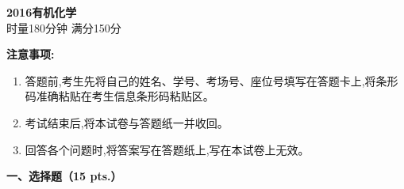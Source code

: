 \begin{center}
    {\LARGE \textbf{2016有机化学}} \\[2ex]
    {\large 时量180分钟 \quad 满分150分}
\end{center}

\vspace{0.5cm}
\noindent\textbf{注意事项:}
\begin{enumerate}[label=\arabic*., parsep=0pt, itemsep=0pt]
    \item 答题前,考生先将自己的姓名、学号、考场号、座位号填写在答题卡上,将条形码准确粘贴在考生信息条形码粘贴区。
    \item 考试结束后,将本试卷与答题纸一并收回。
    \item 回答各个问题时,将答案写在答题纸上,写在本试卷上无效。
\end{enumerate}

\vspace{0.5cm}
\noindent\textbf{一、选择题（15 pts.）}

